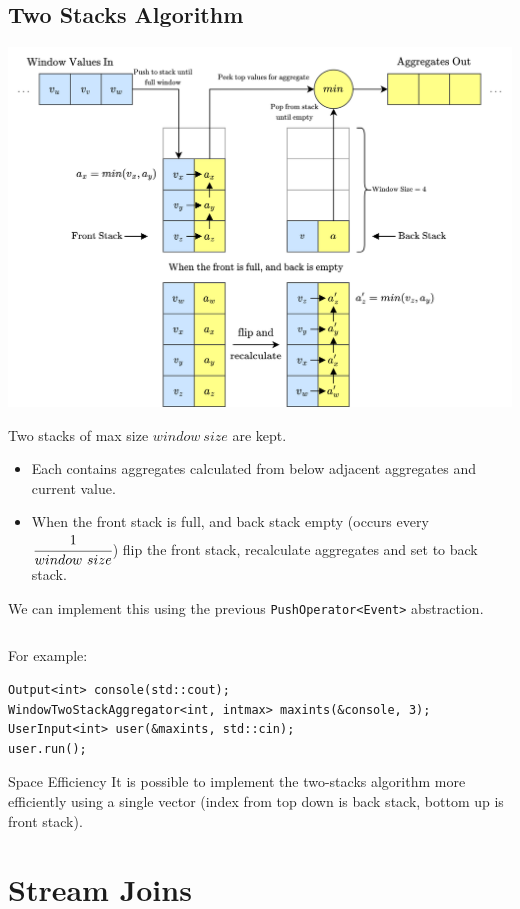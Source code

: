 \subsection{Two Stacks Algorithm}
\begin{center}
    \includegraphics[width=.9\textwidth]{streams/images/two_stacks.drawio.png}
\end{center}
Two stacks of max size $window \ size$ are kept.
\begin{itemize}
    \item Each contains aggregates calculated from below adjacent aggregates and current value.
    \item When the front stack is full, and back stack empty (occurs every $\cfrac{1}{window \ size}$) flip the front stack, recalculate aggregates and set to back stack.
\end{itemize}
We can implement this using the previous \texttt{PushOperator<Event>} abstraction.
\inputminted{cpp}{streams/code/streams/operators/window_two_stack.h}
For example:
\begin{verbatim}
Output<int> console(std::cout);
WindowTwoStackAggregator<int, intmax> maxints(&console, 3);
UserInput<int> user(&maxints, std::cin);
user.run();
\end{verbatim}
\begin{sidenotebox}{Space Efficiency}
    It is possible to implement the two-stacks algorithm more efficiently using a single vector (index from top down is back stack, bottom up is front stack).
\end{sidenotebox}

\section{Stream Joins}
